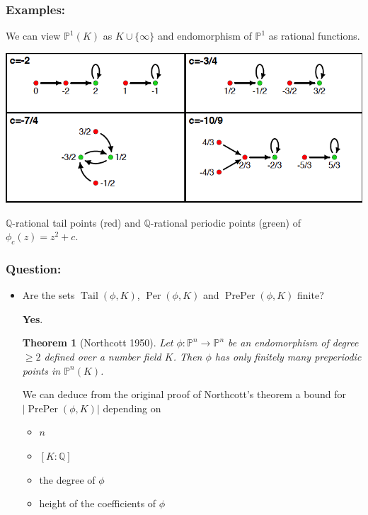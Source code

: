 \documentclass{beamer}
\def\PP{{\mathbb P}}
\def\QQ{{\mathbb Q}}
\DeclareMathOperator{\Tail}{Tail}
\DeclareMathOperator{\Per}{Per}
\DeclareMathOperator{\PrePer}{PrePer}
\theoremstyle{thmstyle}
\theoremstyle{thmstyle}
\newtheorem*{mythm}{Theorem}
\theoremstyle{mystyle}
\theoremstyle{qstnstyle}
\begin{document}
\begin{frame}
\frametitle{Examples:}
We can view $\PP^1(K)$ as $K\cup \{\infty \}$ and endomorphism of $\PP^1$ as rational functions.

\begin{center}
\includegraphics[width=1.0\linewidth]{placeholder4}
\end{center}

$\QQ$-rational tail points (red) and $\QQ$-rational periodic points (green) of  $\phi_c(z)=z^2+c$.
\end{frame}


\begin{frame}
\frametitle{Question:}
\begin{itemize}
\item Are the sets $\Tail(\phi,K)$, $\Per(\phi,K)$ and $\PrePer(\phi,K)$ finite? 

\pause \textbf{Yes}. 
\vspace{6mm}\pause

\begin{mythm}[Northcott 1950]
Let $\phi : \PP^n \to \PP^n$ be an endomorphism of degree $\geq{2}$
defined over a number field $K$. Then $\phi$ has
only finitely many preperiodic points in $\PP^n(K)$.
\end{mythm}

\vspace{6mm} \pause
We can deduce from the original proof of Northcott's theorem  a bound for $|\PrePer(\phi,K)|$ depending on
\begin{itemize}
\item $n$
\item $[K:\QQ]$
\item the degree of $\phi$
\item height of the coefficients of $\phi$
\end{itemize}
\end{itemize}
\end{frame}
\end{document}
